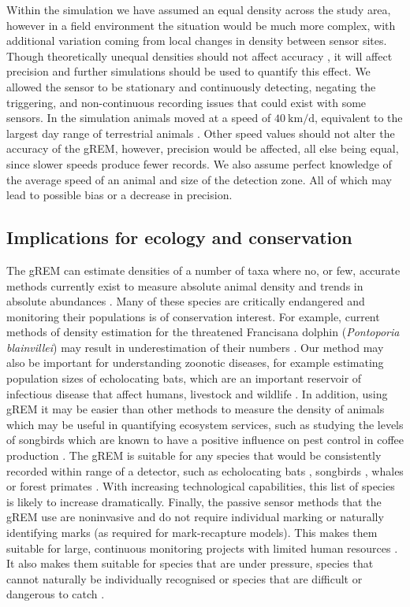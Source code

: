\documentclass[a4paper,10pt,reqno,oneside]{amsart}
\begin{document}
Within the simulation we have assumed an equal density across the study area, however in a field environment the situation would be much more complex, with additional variation coming from local changes in density between sensor sites. Though theoretically unequal densities should not affect accuracy \citep{Hutchinson_Waser_2007}, it will affect precision and further simulations should be used to quantify this effect. We allowed the sensor to be stationary and continuously detecting, negating the triggering, and non-continuous recording issues that could exist with some sensors. In the simulation animals moved at a speed of $\SI{40}{\kilo\meter \per \day}$, equivalent to the largest day range of terrestrial animals \citep{carbone2005far}. Other speed values should not alter the accuracy of the gREM, however, precision would be affected, all else being equal, since slower speeds produce fewer records. We also assume perfect knowledge of the average speed of an animal and size of the detection zone. All of which may lead to possible bias or a decrease in precision. 



\subsection*{Implications for ecology and conservation}
The gREM can estimate densities of a number of taxa where no, or few, accurate methods currently exist to measure absolute animal density and trends in absolute abundances \citep{thomas2012passive}. Many of these species are critically endangered and monitoring their populations is of conservation interest. For example, current methods of density estimation for the threatened Francisana dolphin (\emph{Pontoporia blainvillei}) may result in underestimation of their numbers \citep{crespo2010abundance}. Our method may also be important for understanding zoonotic diseases, for example estimating population sizes of echolocating bats, which are an important reservoir of infectious disease that affect humans, livestock and wildlife \citep{calisher2006bats}. In addition, using gREM it may be easier than other methods to measure the density of animals which may be useful in quantifying ecosystem services, such as studying the levels of songbirds which are known to have a positive influence on pest control in coffee production \citep{jirinec2011roosting}. The gREM is suitable for any species that would be consistently recorded within range of a detector, such as echolocating bats \citep{kunz2009methods}, songbirds \citep{buckland2006point}, whales \citep{marques2009estimating} or forest primates \citep{hassel2008reliable}. With increasing technological capabilities, this list of species is likely to increase dramatically. Finally, the passive sensor methods that the gREM use are noninvasive and do not require individual marking \citep{jewell2013effect} or naturally identifying marks (as required for mark-recapture models). This makes them suitable for large, continuous monitoring projects with limited human resources \citep{kelly2012noninvasive}. It also makes them suitable for species that are under pressure, species that cannot naturally be individually recognised or species that are difficult or dangerous to catch \citep{thomas2012passive}.
\end{document}
